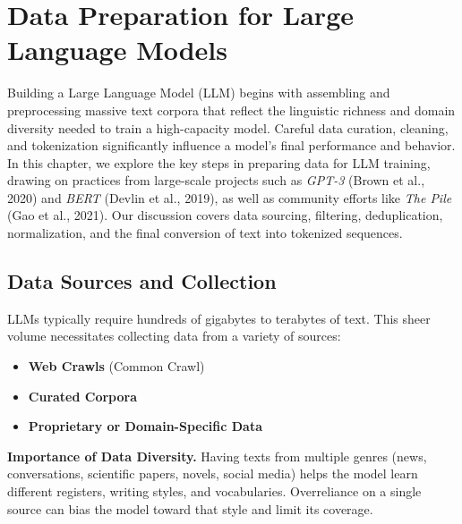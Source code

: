 \chapter{Data Preparation for Large Language Models}
\label{chap:data_preparation}

\noindent
Building a Large Language Model (LLM) begins with assembling and preprocessing massive text corpora that reflect the linguistic richness and domain diversity needed to train a high-capacity model. Careful data curation, cleaning, and tokenization significantly influence a model's final performance and behavior. In this chapter, we explore the key steps in preparing data for LLM training, drawing on practices from large-scale projects such as \emph{GPT-3} (Brown et al., 2020) and \emph{BERT} (Devlin et al., 2019), as well as community efforts like \emph{The Pile} (Gao et al., 2021). Our discussion covers data sourcing, filtering, deduplication, normalization, and the final conversion of text into tokenized sequences.

\section{Data Sources and Collection}
\noindent
LLMs typically require hundreds of gigabytes to terabytes of text. This sheer volume necessitates collecting data from a variety of sources:
\begin{itemize}
    \item \textbf{Web Crawls} (Common Crawl)
    \item \textbf{Curated Corpora}
    \item \textbf{Proprietary or Domain-Specific Data}
\end{itemize}

\noindent
\textbf{Importance of Data Diversity.} 
Having texts from multiple genres (news, conversations, scientific papers, novels, social media) helps the model learn different registers, writing styles, and vocabularies. Overreliance on a single source can bias the model toward that style and limit its coverage.

